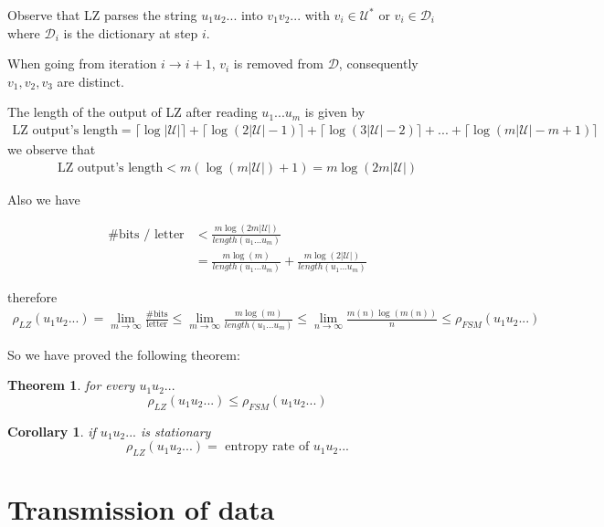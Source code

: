 \documentclass{article}
\newtheorem{theorem}{Theorem}[section]
\newtheorem{corollary}{Corollary}[theorem]
\theoremstyle{definition} %
\def\D{\mathcal{D}}
\def\U{\mathcal{U}}
\begin{document}
Observe that LZ parses the string $u_1 u_2 ...$ into $v_1 v_2 ...$ with $v_i \in \U^*$ or $v_i \in \D_i$ where $\D_i$ is the dictionary at step $i$.

When going from iteration $i \rightarrow i+1$, $v_i$ is removed from $\D$, consequently $v_1, v_2, v_3$ are distinct.

The length of the output of LZ after reading $u_1 ... u_m$ is given by
\begin{align*}
  \text{LZ output's length} = \lceil \log |\U| \rceil + \lceil \log (2 |\U| - 1) \rceil
  + \lceil \log (3 |\U| - 2) \rceil + ...
  + \lceil \log (m|\U| - m + 1) \rceil
\end{align*}
we observe that
\begin{align*}
  \text{LZ output's length} < m(\log(m |\U|) + 1) = m \log(2 m |\U|)
\end{align*}

Also we have

\begin{align*}
  \text{\# bits / letter} &< \frac{m \log(2m |\U|)}{length(u_1 ... u_m)} \\
  &= \frac{m \log(m)}{ length(u_1 ... u_m)} + \frac{m \log(2 |\U|)}{length(u_1 ... u_m)}
\end{align*}

therefore
\begin{align*}
  \rho_{LZ}(u_1 u_2 ...) = \lim_{m \to \infty} \frac{\text{\# bits}}{\text{letter}} \leq \lim_{m \to \infty} \frac{m \log(m)}{length(u_1 ... u_m)} \leq \lim_{n \to \infty} \frac{m(n) \log(m(n))}{n} \leq \rho_{FSM}(u_1 u_2 ...)
\end{align*}

So we have proved the following theorem:

\begin{theorem}
  for every $u_1 u_2 ...$
  $$ \rho_{LZ}(u_1 u_2 ...) \leq \rho_{FSM}(u_1 u_2 ...) $$
\end{theorem}

\begin{corollary}
  if $u_1 u_2 ...$ is stationary
  $$ \rho_{LZ}(u_1 u_2 ...) = \text{ entropy rate of } u_1 u_2 ...$$
\end{corollary}



\section{Transmission of data}
\end{document}
